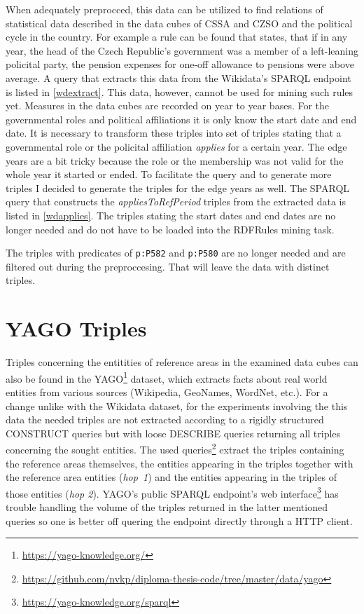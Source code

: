 When adequately preprocced, this data can be utilized to find relations of statistical data described in the data cubes of CSSA and CZSO and the political cycle in the country. For example a rule can be found that states, that if in any year, the head of the Czech Republic's government was a member of a left-leaning policital party, the pension expenses for one-off allowance to pensions were above average. A query that extracts this data from the Wikidata's SPARQL endpoint is listed in \ref{wdextract}. This data, however, cannot be used for mining such rules yet. Measures in the data cubes are recorded on year to year bases. For the governmental roles and political affiliations it is only know the start date and end date. It is necessary to transform these triples into set of triples stating that a governmental role or the policital affiliation \textit{applies} for a certain year. The edge years are a bit tricky because the role or the membership was not valid for the whole year it started or ended. To facilitate the query and to generate more triples I decided to generate the triples for the edge years as well. The SPARQL query that constructs the \textit{appliesToRefPeriod} triples from the extracted data is listed in \ref{wdapplies}. The triples stating the start dates and end dates are no longer needed and do not have to be loaded into the RDFRules mining task.

The triples with predicates of \verb|p:P582| and \verb|p:P580| are no longer needed and are filtered out during the preproccesing. That will leave the data with  distinct triples.

\section{YAGO Triples}

Triples concerning the entitities of reference areas in the examined data cubes can also be found in the YAGO\footnote{\href{https://yago-knowledge.org/}{https://yago-knowledge.org/}} dataset, which extracts facts about real world entities from various sources (Wikipedia, GeoNames, WordNet, etc.). For a change unlike with the Wikidata dataset, for the experiments involving the this data the needed triples are not extracted according to a rigidly structured CONSTRUCT queries but with loose DESCRIBE queries returning all triples concerning the sought entities. The used queries\footnote{\href{https://github.com/nvkp/diploma-thesis-code/tree/master/data/yago}{https://github.com/nvkp/diploma-thesis-code/tree/master/data/yago}} extract the triples containing the reference areas themselves, the entities appearing in the triples together with the reference area entities (\textit{hop~1}) and the entities appearing in the triples of those entities (\textit{hop 2}). YAGO's public SPARQL endpoint's web interface\footnote{\href{https://yago-knowledge.org/sparql}{https://yago-knowledge.org/sparql}} has trouble handling the volume of the triples returned in the latter mentioned queries so one is better off quering the endpoint directly through a HTTP client.

